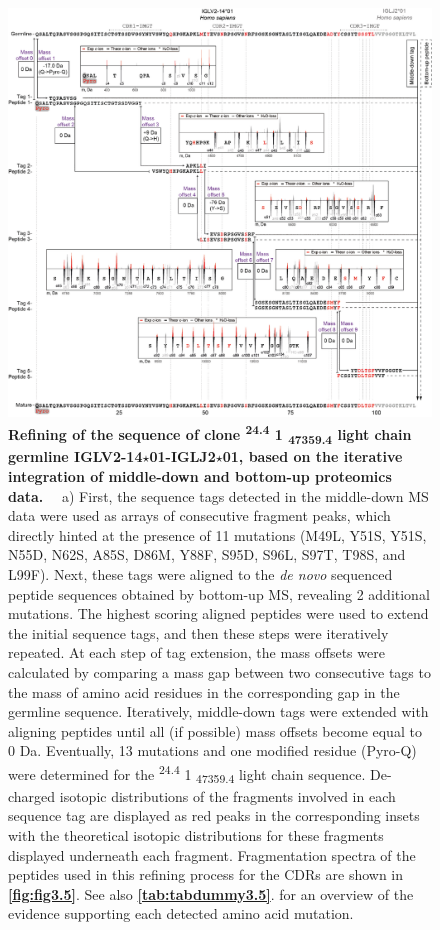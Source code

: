 \begin{subappendices}
  \begin{figure}[!ht]
    \center
    \includegraphics[]{Chapter.3/Figures/fs8.png}
    \caption{
      \textbf{Refining of the sequence of clone \textsuperscript{24.4} 1 \textsubscript{47359.4} light chain germline IGLV2-14$\star$01-IGLJ2$\star$01, based on the iterative integration of middle-down and bottom-up proteomics data.} ~~a) First, the sequence tags detected in the middle-down MS data were used as arrays of consecutive fragment peaks, which directly hinted at the presence of 11 mutations (M49L, Y51S, Y51S, N55D, N62S, A85S, D86M, Y88F, S95D, S96L, S97T, T98S, and L99F). Next, these tags were aligned to the \emph{de novo} sequenced peptide sequences obtained by bottom-up MS, revealing 2 additional mutations. The highest scoring aligned peptides were used to extend the initial sequence tags, and then these steps were iteratively repeated. At each step of tag extension, the mass offsets were calculated by comparing a mass gap between two consecutive tags to the mass of amino acid residues in the corresponding gap in the germline sequence. Iteratively, middle-down tags were extended with aligning peptides until all (if possible) mass offsets become equal to 0 Da. Eventually, 13 mutations and one modified residue (Pyro-Q) were determined for the \textsuperscript{24.4} 1 \textsubscript{47359.4} light chain sequence. De-charged isotopic distributions of the fragments involved in each sequence tag are displayed as red peaks in the corresponding insets with the theoretical isotopic distributions for these fragments displayed underneath each fragment. Fragmentation spectra of the peptides used in this refining process for the CDRs are shown in \textbf{\autoref{fig:fig3.5}}. See also \textbf{\autoref{tab:tabdummy3.5}}. for an overview of the evidence supporting each detected amino acid mutation.
    }
    \label{fig:figs3.8}
  \end{figure}


\end{subappendices}
